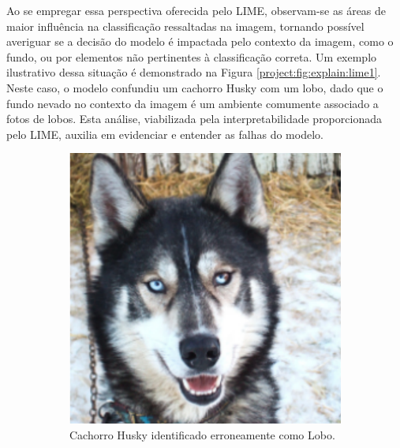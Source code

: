 Ao se empregar essa perspectiva oferecida pelo LIME, observam-se as áreas de maior influência na classificação ressaltadas na imagem, tornando possível averiguar se a decisão do modelo é impactada pelo contexto da imagem, como o fundo, ou por elementos não pertinentes à classificação correta. Um exemplo ilustrativo dessa situação é demonstrado na Figura \ref{project:fig:explain:lime1}. Neste caso, o modelo confundiu um cachorro Husky com um lobo, dado que o fundo nevado no contexto da imagem é um ambiente comumente associado a fotos de lobos. Esta análise, viabilizada pela interpretabilidade proporcionada pelo LIME, auxilia em evidenciar e entender as falhas do modelo.

\begin{figure}[H]
    \centering
    \caption{Exemplo de saída gerado pelo LIME em situação de erro.}
    \label{project:fig:explain:lime1}
    \begin{subfigure}[t]{0.45\textwidth}
        \centering
        \includegraphics[width=1\linewidth]{recursos/imagens/project/husky.png}
        \caption{Cachorro Husky identificado erroneamente como Lobo.}
        \label{project:fig:explain:lime1.1}
    \end{subfigure}%
    ~
    \begin{subfigure}[t]{0.45\textwidth}
        \centering

\end{subfigure}
\end{figure}
